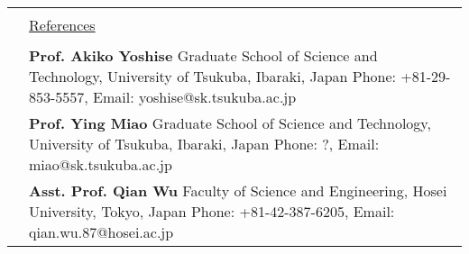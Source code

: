 \documentclass[letterpaper,11pt]{article}
\newcommand{\headingfont}{\LARGE \MakeUppercase }
\newenvironment{SectionTable}[1]{
	\renewcommand*{\arraystretch}{1.0}
	\setlength{\tabcolsep}{10pt}
	\begin{longtable}{Rp{5.2in}} 
		\rule{2.5cm}{4pt} 
		& \underline{#1} \\ %
	}
	{
	\end{longtable}\vspace{-.3cm}
}
\begin{document}



\begin{SectionTable}{\headingfont References}
	&
	\textbf{Prof. Akiko Yoshise} \newline
	Graduate School of Science and Technology, University of Tsukuba, Ibaraki, Japan \newline 
	Phone: +81-29-853-5557, Email: yoshise@sk.tsukuba.ac.jp \\
	
	& 
	\textbf{Prof. Ying Miao} \newline
	Graduate School of Science and Technology, University of Tsukuba, Ibaraki, Japan \newline 
	Phone: ?, Email: miao@sk.tsukuba.ac.jp\\
	
	& 
	\textbf{Asst. Prof. Qian Wu} \newline
	Faculty of Science and Engineering, Hosei University, Tokyo, Japan \newline 
	Phone: +81-42-387-6205, Email: qian.wu.87@hosei.ac.jp \\
\end{SectionTable}
	

\label{LastPage}  %
\end{document}
